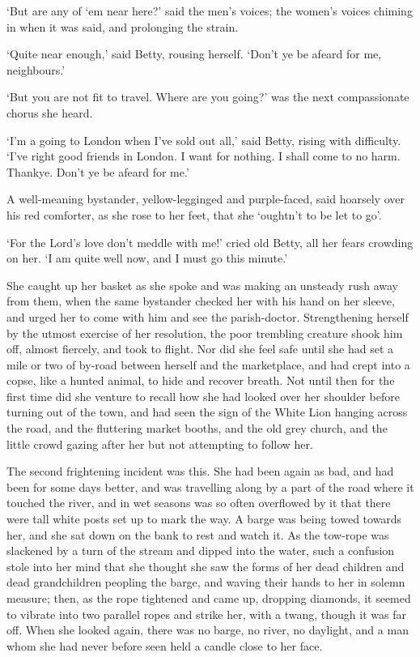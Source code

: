 ‘But are any of ‘em near here?’ said the men’s voices; the women’s
voices chiming in when it was said, and prolonging the strain.

‘Quite near enough,’ said Betty, rousing herself. ‘Don’t ye be afeard
for me, neighbours.’

‘But you are not fit to travel. Where are you going?’ was the next
compassionate chorus she heard.

‘I’m a going to London when I’ve sold out all,’ said Betty, rising with
difficulty. ‘I’ve right good friends in London. I want for nothing. I
shall come to no harm. Thankye. Don’t ye be afeard for me.’

A well-meaning bystander, yellow-legginged and purple-faced, said
hoarsely over his red comforter, as she rose to her feet, that she
‘oughtn’t to be let to go’.

‘For the Lord’s love don’t meddle with me!’ cried old Betty, all her
fears crowding on her. ‘I am quite well now, and I must go this minute.’

She caught up her basket as she spoke and was making an unsteady rush
away from them, when the same bystander checked her with his hand on
her sleeve, and urged her to come with him and see the parish-doctor.
Strengthening herself by the utmost exercise of her resolution, the poor
trembling creature shook him off, almost fiercely, and took to flight.
Nor did she feel safe until she had set a mile or two of by-road between
herself and the marketplace, and had crept into a copse, like a hunted
animal, to hide and recover breath. Not until then for the first time
did she venture to recall how she had looked over her shoulder before
turning out of the town, and had seen the sign of the White Lion hanging
across the road, and the fluttering market booths, and the old grey
church, and the little crowd gazing after her but not attempting to
follow her.

The second frightening incident was this. She had been again as bad, and
had been for some days better, and was travelling along by a part of
the road where it touched the river, and in wet seasons was so often
overflowed by it that there were tall white posts set up to mark the
way. A barge was being towed towards her, and she sat down on the bank
to rest and watch it. As the tow-rope was slackened by a turn of the
stream and dipped into the water, such a confusion stole into her
mind that she thought she saw the forms of her dead children and dead
grandchildren peopling the barge, and waving their hands to her in
solemn measure; then, as the rope tightened and came up, dropping
diamonds, it seemed to vibrate into two parallel ropes and strike her,
with a twang, though it was far off. When she looked again, there was no
barge, no river, no daylight, and a man whom she had never before seen
held a candle close to her face.

